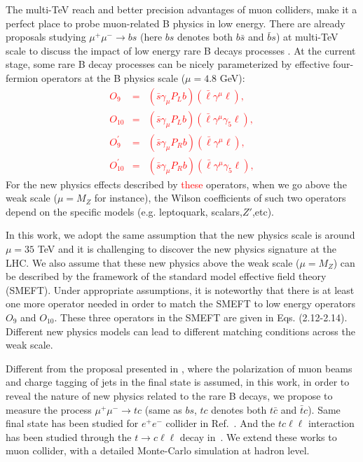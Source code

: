 \documentclass[a4paper,11pt]{article}
\begin{document}
The multi-TeV reach and better precision advantages of muon colliders, make it a perfect place to probe muon-related B physics in low energy. 
There are already proposals studying $\mu^+\mu^-\to bs$ (here $bs$ denotes both $b\bar{s}$ and $\bar{b}s$) at multi-TeV scale to discuss the impact of low energy rare B decays processes \cite{Altmannshofer:2022xri,Huang:2021nkl,Huang:2021biu}. 
At the current stage, some rare B decay processes can be nicely parameterized by effective four-fermion operators at the B physics scale ($\mu= 4.8$ GeV):
\textcolor{red}{
 \begin{eqnarray}
   O_9 &=& (\bar{s}\gamma_\mu P_L b)(\bar{\ell}\gamma^{\mu}\ell),  \\
   O_{10} &=& (\bar{s}\gamma_\mu P_L b)(\bar{\ell}\gamma^{\mu}\gamma_5\ell), \\
   O^{\prime}_9 &=& (\bar{s}\gamma_\mu P_R b)(\bar{\ell}\gamma^{\mu}\ell),\\
   O^{\prime}_{10} &=& (\bar{s}\gamma_\mu P_R b)(\bar{\ell}\gamma^{\mu}\gamma_5\ell),
\end{eqnarray}
}
For the new physics effects described by \textcolor{red}{these} operators, when we go above the weak scale ($\mu=M_Z$ for instance), 
the Wilson coefficients of such two operators depend on the specific models (e.g. leptoquark, scalars,$Z'$,etc). 

In this work, we adopt the same assumption that the new physics scale is around $\mu=35$ TeV and it is challenging to discover the new physics signature at the LHC. 
We also assume that these new physics above the weak scale ($\mu=M_Z$) can be described by the framework of the standard model effective field theory (SMEFT). 
Under appropriate assumptions, it is noteworthy that there is at least one more operator needed in order to match the SMEFT to low energy operators $O_9$ and $O_{10}$. 
These three operators in the SMEFT are given in Eqs. (2.12-2.14). 
Different new physics models can lead to different matching conditions across the weak scale.

Different from the proposal presented in \cite{Altmannshofer:2022xri}, 
where the polarization of muon beams and charge tagging of jets in the final state is assumed, 
in this work, in order to reveal the nature of new physics related to the rare B decays, 
we propose to measure the process $\mu^+\mu^-\to tc$ (same as $bs$,  $tc$ denotes both $t \bar{c}$ and $\bar{t} c$). 
Same final state has been studied for $e^+e^-$ collider in Ref.~\cite{Bar-Shalom:1997ezk,Bar-Shalom:1997htk,Bar-Shalom:1999dtk}.
And the $tc\ell\ell$ interaction has been studied through the $t\to c\ell\ell$ decay in~\cite{Bause:2020auq}. 
We extend these works to muon collider, with a detailed Monte-Carlo simulation at hadron level.
\end{document}
